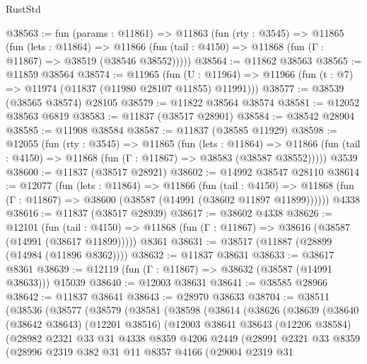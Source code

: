 \begin{lexlean}{RustStd}
\begin{coremodule}
@38563 := fun (params : @11861) =>
  @11863
    (fun (rty : @3545) =>
    @11865
      (fun (lets : @11864) =>
      @11866 (fun (tail : @4150) => @11868 (fun (Γ : @11867) => @38519 (@38546 @38552)))))
@38564 := @11862 @38563
@38565 := @11859 @38564
@38574 := @11965
    (fun (U : @11964) => @11966 (fun (t : @7) => @11974 (@11837 (@11980 @28107 @11855) @11991)))
@38577 := @38539 (@38565 @38574) @28105
@38579 := @11822 @38564 @38574
@38581 := @12052 @38563 @6819
@38583 := @11837 (@38517 @28901)
@38584 := @38542 @28904
@38585 := @11908 @38584
@38587 := @11837 (@38585 @11929)
@38598 := @12055
    (fun (rty : @3545) =>
    @11865
      (fun (lets : @11864) =>
      @11866 (fun (tail : @4150) => @11868 (fun (Γ : @11867) => @38583 (@38587 @38552)))))
    @3539
@38600 := @11837 (@38517 @28921)
@38602 := @14992 @38547 @28110
@38614 := @12077
    (fun (lets : @11864) =>
    @11866
      (fun (tail : @4150) =>
      @11868 (fun (Γ : @11867) => @38600 (@38587 (@14991 (@38602 @11897 @11899))))))
    @4338
@38616 := @11837 (@38517 @28939)
@38617 := @38602 @4338
@38626 := @12101
    (fun (tail : @4150) => @11868 (fun (Γ : @11867) => @38616 (@38587 (@14991 (@38617 @11899)))))
    @8361
@38631 := @38517 (@11887 (@28899 (@14984 (@11896 @8362))))
@38632 := @11837 @38631
@38633 := @38617 @8361
@38639 := @12119 (fun (Γ : @11867) => @38632 (@38587 (@14991 @38633))) @15039
@38640 := @12003 @38631
@38641 := @38585 @28966
@38642 := @11837 @38641
@38643 := @28970 @38633
@38704 := @38511
    (@38536
      (@38577
        (@38579
          (@38581
            (@38598
              (@38614
                (@38626
                  (@38639
                    (@38640
                      (@38642 @38643)
                      (@12201 @38516)
                      (@12003
                        @38641
                        @38643
                        (@12206 @38584)
                        (@28982
                          @2321
                          @33
                          @31
                          @4338
                          @8359
                          @4206
                          @2449
                          (@28991
                            @2321
                            @33
                            @8359
                            (@28996
                              @2319
                              @382
                              @31
                              @11
                              @8357
                              @4166
                              (@29004
                                @2319
                                @31

\end{coremodule}
\end{lexlean}
